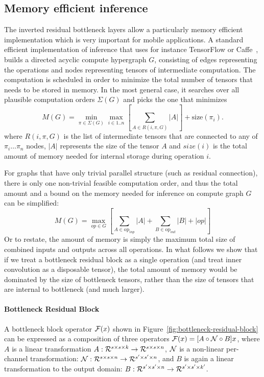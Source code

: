 \documentclass[10pt,twocolumn,letterpaper]{article}
\def\real{{\cal R}}
\begin{document}
\subsection{Memory efficient inference}
The inverted residual bottleneck layers allow a particularly memory efficient implementation which is very important for mobile applications. A standard efficient implementation of inference that uses for instance
TensorFlow\cite{tensorflow2015-whitepaper} or Caffe~\cite{caffe},  builds a directed acyclic compute hypergraph $G$, consisting of edges representing the operations and nodes representing tensors of intermediate computation. The computation is scheduled in order to minimize the total number of tensors that needs to be stored in memory.
In the most general case, it searches over all plausible computation orders $\Sigma(G)$ and picks the one that minimizes
$$
 M(G) = \min_{\pi\in \Sigma(G)} \max_{i \in 1..n} \left[\sum_{A \in R(i, \pi, G)} |A|\right] + \text{size}(\pi_i).
$$
where $R(i, \pi, G)$ is the list of intermediate tensors that are connected to any of $\pi_{i}\dots \pi_{n}$ nodes, $|A|$ represents the size of the tensor $A$ and
$size(i)$ is the total amount of memory needed for internal storage during operation $i$.

For graphs that have only trivial parallel structure (such as residual connection), there is only one non-trivial feasible computation order, and thus the total amount and a  bound  on the memory needed for inference on compute graph $G$ can be simplified: 
\begin{equation}
\label{eq:naive-lower-bound-mu}
M(G) = \max_{op \in G} \left[\sum_{A \in \text{op}_{inp}} |A| + \sum_{B \in \text{op}_{out}} |B| + |op|\right]
\end{equation}
Or to restate, the amount of memory is simply the maximum total size of combined inputs and outputs across all operations. In what follows we show that if we treat a bottleneck residual block as a single operation (and treat inner convolution
as a disposable tensor), the total amount of memory would be dominated by the size of bottleneck tensors, rather than the size of tensors that are internal to bottleneck (and much larger). 

\paragraph{Bottleneck Residual Block}
\def\F{{\cal F}}
\def\N{{\cal N}}
A bottleneck block operator $\F(x)$ shown in Figure~\ref{fig:bottleneck-residual-block} can be expressed as a composition of three
operators $\F(x) = [A \circ \N \circ  B] x$, where $A$ is a linear
transformation $A:\real^{s \times s \times k} \rightarrow \real^{s \times s \times n}$,  $\N$ is a non-linear per-channel transformation: $\N: \real^{s \times s \times n} \rightarrow \real^{s' \times s' \times n}$, and $B$ is again a linear transformation to the output domain: $B: \real^{s' \times s' \times n} \rightarrow \real^{s' \times s' \times k'}$.
\end{document}
